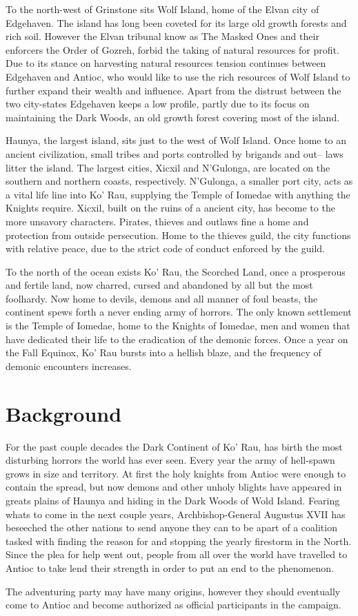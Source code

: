 To the north-west of Grinstone sits Wolf Island, home of the Elvan city of 
Edgehaven. The island has long been coveted for its large old growth forests and 
rich soil.  However the Elvan tribunal know as The Masked Ones and their enforcers
the Order of Gozreh, forbid the taking of natural resources for profit.  Due to
its stance on harvesting natural resources tension continues between Edgehaven and 
Antioc, who would like to use the rich resources of Wolf Island to further expand
their wealth and influence.  Apart from the distrust between the two city-states
Edgehaven keeps a low profile, partly due to its focus on maintaining the Dark 
Woods, an old growth forest covering most of the island.

Haunya, the largest island, sits just to the west of Wolf Island.  Once home to
an ancient civilization, small tribes and ports controlled by brigands and out--
laws litter the island.  The largest cities, Xicxil and N'Gulonga, are located on
the southern and northern coasts, respectively.  N'Gulonga, a smaller port city,
acts as a vital life line into Ko' Rau, supplying the Temple of Iomedae with anything
the Knights require.  Xicxil, built on the ruins of a ancient city, has become
to the more unsavory characters.  Pirates, thieves and outlaws fine a home and
protection from outside persecution.  Home to the thieves guild, the city functions
with relative peace, due to the strict code of conduct enforced by the guild.

To the north of the ocean exists Ko' Rau, the Scorched Land, once a prosperous and 
fertile land, now charred, cursed and abandoned by all but the most foolhardy.  Now
home to devils, demons and all manner of foul beasts, the continent spews forth 
a never ending army of horrors.  The only known settlement is the Temple of Iomedae,
home to the Knights of Iomedae, men and women that have dedicated their life to 
the eradication of the demonic forces.  Once a year on the Fall Equinox, Ko' Rau 
bursts into a hellish blaze, and the frequency of demonic encounters increases.

\section{Background}

For the past couple decades the Dark Continent of Ko' Rau, has birth the most
disturbing horrors the world has ever seen.  Every year the army of hell-spawn
grows in size and territory.  At first the holy knights from Antioc were enough
to contain the spread, but now demons and other unholy blights have appeared in 
greats plains of Haunya and hiding in the Dark Woods of Wold Island.  Fearing 
whats to come in the next couple years, Archbishop-General Augustus XVII has 
beseeched the other nations to send anyone they can to be apart of a coalition 
tasked with finding the reason for and stopping the yearly firestorm in the North.
Since the plea for help went out, people from all over the world have travelled 
to Antioc to take lend their strength in order to put an end to the phenomenon.

The adventuring party may have many origins, however they should eventually 
come to Antioc and become authorized as official participants in the campaign.

